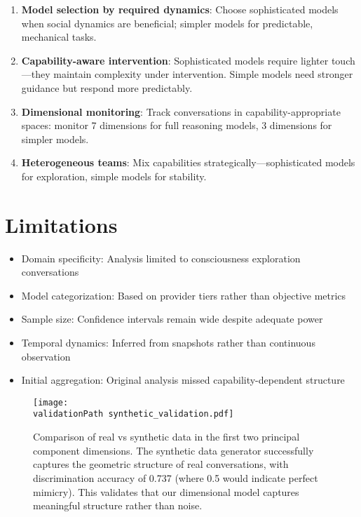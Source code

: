\documentclass[11pt,letterpaper]{article}
\newcommand{\fullReasoningPCANinety}{7}
\newcommand{\noReasoningPCANinety}{3}
\newcommand{\syntheticDiscriminationAccuracy}{0.737}
\newcommand{\validationPath}{../analysis/analysis_outputs/validation/}
\begin{document}
\begin{enumerate}
    \item \textbf{Model selection by required dynamics}: Choose sophisticated models when social dynamics are beneficial; simpler models for predictable, mechanical tasks.
    
    \item \textbf{Capability-aware intervention}: Sophisticated models require lighter touch—they maintain complexity under intervention. Simple models need stronger guidance but respond more predictably.
    
    \item \textbf{Dimensional monitoring}: Track conversations in capability-appropriate spaces: monitor \fullReasoningPCANinety{} dimensions for full reasoning models, \noReasoningPCANinety{} dimensions for simpler models.
    
    \item \textbf{Heterogeneous teams}: Mix capabilities strategically—sophisticated models for exploration, simple models for stability.
\end{enumerate}

\section{Limitations}

\begin{itemize}
    \item Domain specificity: Analysis limited to consciousness exploration conversations
    \item Model categorization: Based on provider tiers rather than objective metrics
    \item Sample size: Confidence intervals remain wide despite adequate power
    \item Temporal dynamics: Inferred from snapshots rather than continuous observation
    \item Initial aggregation: Original analysis missed capability-dependent structure
\end{itemize}

\begin{figure}[htbp]
\centering
\texttt{[image: \\validationPath synthetic\_validation.pdf]}
\caption{Comparison of real vs synthetic data in the first two principal component dimensions. The synthetic data generator successfully captures the geometric structure of real conversations, with discrimination accuracy of \syntheticDiscriminationAccuracy{} (where 0.5 would indicate perfect mimicry). This validates that our dimensional model captures meaningful structure rather than noise.}
\label{fig:synthetic_validation}
\end{figure}
\end{document}
